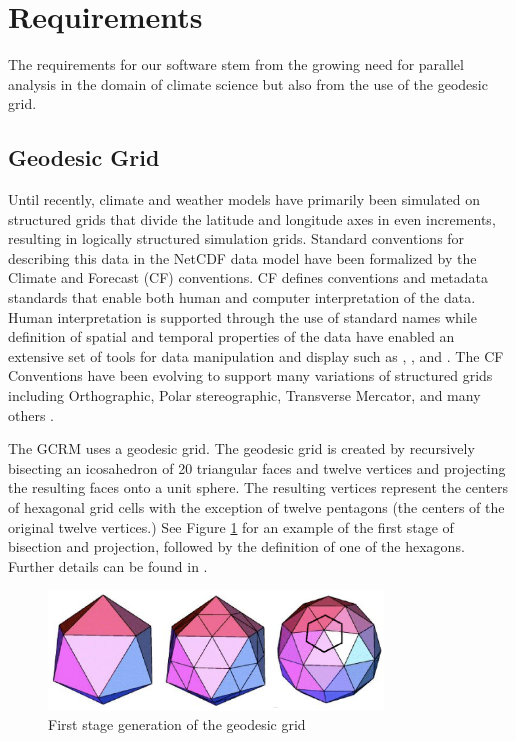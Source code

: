 \section{Requirements}
\label{section:requirements}

The requirements for our software stem from the growing need for parallel
analysis in the domain of climate science\cite{MODSIM07:LOT} but also from
the use of the geodesic grid.

\subsection{Geodesic Grid}
\label{subsection:grid}

Until recently, climate and weather models have primarily been simulated on
structured grids that divide the latitude and longitude axes in even
increments, resulting in logically structured simulation grids. Standard
conventions for describing this data in the NetCDF data model have been
formalized by the Climate and Forecast (CF) conventions\cite{CF}. CF defines
conventions and metadata standards that enable both human and computer
interpretation of the data.  Human interpretation is supported through the use
of standard names while definition of spatial and temporal properties of the
data have enabled an extensive set of tools for data manipulation and display
such as \cite{NCO}, \cite{OPeNDAP}, and \cite{FERRET}.  The CF Conventions
have been evolving to support many variations of structured grids including
Orthographic, Polar stereographic, Transverse Mercator, and many others . 

The GCRM uses a geodesic grid.  The geodesic grid is created by recursively
bisecting an icosahedron of 20 triangular faces and twelve vertices and
projecting the resulting faces onto a unit sphere.  The resulting vertices
represent the centers of hexagonal grid cells with the exception of twelve
pentagons (the centers of the original twelve vertices.) See Figure
\ref{fig:geodesic} for an example of the first stage of bisection and
projection, followed by the definition of one of the hexagons.  Further
details can be found in \cite{GEODESIC}.

\begin{figure}[!t]
\center
\includegraphics[width=3.5in]{images/geodesic2}
\caption{First stage generation of the geodesic grid}
\label{fig:geodesic}
\end{figure}

